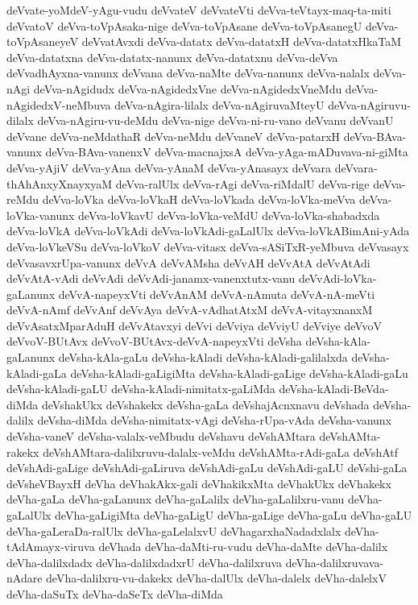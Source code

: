 {deVvate-yoMdeV-yAgu-vudu
deVvateV
deVvateVti
deVva-teVtayx-maq-ta-miti
deVvatoV
deVva-toVpAsaka-nige
deVva-toVpAsane
deVva-toVpAsanegU
deVva-toVpAsaneyeV
deVvatAvxdi
deVva-datatx
deVva-datatxH
deVva-datatxHkaTaM
deVva-datatxna
deVva-datatx-nanunx
deVva-datatxnu
deVva-deVva
deVvadhAyxna-vanunx
deVvana
deVva-naMte
deVva-nanunx
deVva-nalalx
deVva-nAgi
deVva-nAgidudx
deVva-nAgidedxVne
deVva-nAgidedxVneMdu
deVva-nAgidedxV-neMbuva
deVva-nAgira-lilalx
deVva-nAgiruvaMteyU
deVva-nAgiruvu-dilalx
deVva-nAgiru-vu-deMdu
deVva-nige
deVva-ni-ru-vano
deVvanu
deVvanU
deVvane
deVva-neMdathaR
deVva-neMdu
deVvaneV
deVva-patarxH
deVva-BAva-vanunx
deVva-BAva-vanenxV
deVva-macnajxsA
deVva-yAga-mADuvava-ni-giMta
deVva-yAjiV
deVva-yAna
deVva-yAnaM
deVva-yAnasayx
deVvara
deVvara-thAhAnxyXnayxyaM
deVva-ralUlx
deVva-rAgi
deVva-riMdalU
deVva-rige
deVva-reMdu
deVva-loVka
deVva-loVkaH
deVva-loVkada
deVva-loVka-meVva
deVva-loVka-vanunx
deVva-loVkavU
deVva-loVka-veMdU
deVva-loVka-shabadxda
deVva-loVkA
deVva-loVkAdi
deVva-loVkAdi-gaLalUlx
deVva-loVkABimAni-yAda
deVva-loVkeVSu
deVva-loVkoV
deVva-vitasx
deVva-sASiTxR-yeMbuva
deVvasayx
deVvasavxrUpa-vanunx
deVvA
deVvAMsha
deVvAH
deVvAtA
deVvAtAdi
deVvAtA-vAdi
deVvAdi
deVvAdi-janamx-vanenxtutx-vanu
deVvAdi-loVka-gaLanunx
deVvA-napeyxVti
deVvAnAM
deVvA-nAmuta
deVvA-nA-meVti
deVvA-nAmf
deVvAnf
deVvAya
deVvA-vAdhatAtxM
deVvA-vitayxnanxM
deVvAsatxMparAduH
deVvAtavxyi
deVvi
deVviya
deVviyU
deVviye
deVvoV
deVvoV-BUtAvx
deVvoV-BUtAvx-deVvA-napeyxVti
deVsha
deVsha-kAla-gaLanunx
deVsha-kAla-gaLu
deVsha-kAladi
deVsha-kAladi-galilalxda
deVsha-kAladi-gaLa
deVsha-kAladi-gaLigiMta
deVsha-kAladi-gaLige
deVsha-kAladi-gaLu
deVsha-kAladi-gaLU
deVsha-kAladi-nimitatx-gaLiMda
deVsha-kAladi-BeVda-diMda
deVshakUkx
deVshakekx
deVsha-gaLa
deVshajAcnxnavu
deVshada
deVsha-dalilx
deVsha-diMda
deVsha-nimitatx-vAgi
deVsha-rUpa-vAda
deVsha-vanunx
deVsha-vaneV
deVsha-valalx-veMbudu
deVshavu
deVshAMtara
deVshAMta-rakekx
deVshAMtara-dalilxruvu-dalalx-veMdu
deVshAMta-rAdi-gaLa
deVshAtf
deVshAdi-gaLige
deVshAdi-gaLiruva
deVshAdi-gaLu
deVshAdi-gaLU
deVshi-gaLa
deVsheVBayxH
deVha
deVhakAkx-gali
deVhakikxMta
deVhakUkx
deVhakekx
deVha-gaLa
deVha-gaLanunx
deVha-gaLalilx
deVha-gaLalilxru-vanu
deVha-gaLalUlx
deVha-gaLigiMta
deVha-gaLigU
deVha-gaLige
deVha-gaLu
deVha-gaLU
deVha-gaLeraDa-ralUlx
deVha-gaLelalxvU
deVhagarxhaNadadxlalx
deVha-tAdAmayx-viruva
deVhada
deVha-daMti-ru-vudu
deVha-daMte
deVha-dalilx
deVha-dalilxdadx
deVha-dalilxdadxrU
deVha-dalilxruva
deVha-dalilxruvava-nAdare
deVha-dalilxru-vu-dakekx
deVha-dalUlx
deVha-dalelx
deVha-dalelxV
deVha-daSuTx
deVha-daSeTx
deVha-diMda
}
